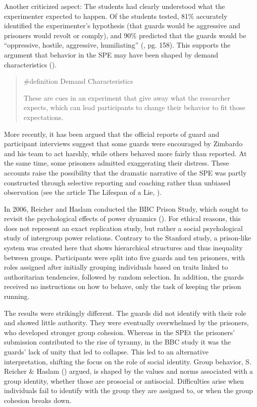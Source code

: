 \documentclass[
  letterpaper,
]{book}
\begin{document}
Another criticized aspect: The students had clearly understood what the
experimenter expected to happen. Of the students tested, 81\% accurately
identified the experimenter's hypothesis (that guards would be
aggressive and prisoners would revolt or comply), and 90\% predicted
that the guards would be ``oppressive, hostile, aggressive,
humiliating'' (, pg. 158). This supports the argument that behavior in
the SPE may have been shaped by demand characteristics
().

\begin{quote}
\label{def-demandcharacteristics}{\#definition} Demand
Characteristics

These are cues in an experiment that give away what the researcher
expects, which can lead participants to change their behavior to fit
those expectations.
\end{quote}

More recently, it has been argued that the official reports of guard and
participant interviews suggest that some guards were encouraged by
Zimbardo and his team to act harshly, while others behaved more fairly
than reported. At the same time, some prisoners admitted exaggerating
their distress. These accounts raise the possibility that the dramatic
narrative of the SPE was partly constructed through selective reporting
and coaching rather than unbiased observation (see the article The
Lifespan of a Lie, ).

In 2006, Reicher and Haslam conducted the BBC Prison Study, which sought
to revisit the psychological effects of power dynamics
().
For ethical reasons, this does not represent an exact replication study,
but rather a social psychological study of intergroup power relations.
Contrary to the Stanford study, a prison-like system was created here
that shows hierarchical structures and thus inequality between groups.
Participants were split into five guards and ten prisoners, with roles
assigned after initially grouping individuals based on traits linked to
authoritarian tendencies, followed by random selection. In addition, the
guards received no instructions on how to behave, only the task of
keeping the prison running.

The results were strikingly different. The guards did not identify with
their role and showed little authority. They were eventually overwhelmed
by the prisoners, who developed stronger group cohesion. Whereas in the
SPEt the prisoners' submission contributed to the rise of tyranny, in
the BBC study it was the guards' lack of unity that led to collapse.
This led to an alternative interpretation, shifting the focus on the
role of social identity. Group behavior, S. Reicher \& Haslam
() argued, is shaped by the
values and norms associated with a group identity, whether those are
prosocial or antisocial. Difficulties arise when individuals fail to
identify with the group they are assigned to, or when the group cohesion
breaks down.
\end{document}
